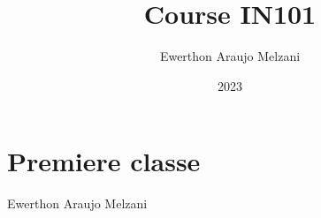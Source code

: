 \documentclass{article}
\title{Course IN101}
\author{Ewerthon Araujo Melzani}
\date{2023}
\begin{document}
\maketitle

\section*{Premiere classe}

\vspace*{1.5 cm}



\vspace*{1.5 cm}



\LARGE Ewerthon Araujo Melzani
\end{document}

